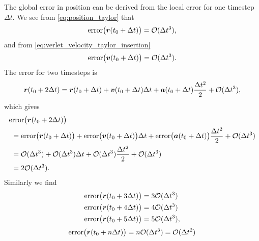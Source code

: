 The global error in position can be derived from the local error for one timestep $\Delta t$. We see from \cref{eq:position_taylor} that
\begin{align*}
    \text{error}\big(\boldsymbol{r}(t_0+\Delta t)\big) = \mathcal{O}(\Delta t^3),
\end{align*}
and from \cref{eq:verlet_velocity_taylor_insertion}
\begin{align*}
    \text{error}\big(\boldsymbol{v}(t_0+\Delta t)\big) = \mathcal{O}(\Delta t^3).
\end{align*}
The error for two timesteps is
\begin{align*}
    \boldsymbol{r}(t_0+2\Delta t) 
    &= \boldsymbol{r}(t_0+\Delta t) + \boldsymbol{v}(t_0+\Delta t)\Delta t + \boldsymbol{a}(t_0+\Delta t)\frac{\Delta t^2}{2} + \mathcal{O}(\Delta t^3), \\
\end{align*}
which gives 
\begin{align*}
    &\text{error}\big(\boldsymbol{r}(t_0+2\Delta t)\big) \\
    &~= \text{error}\big(\boldsymbol{r}(t_0+\Delta t)\big) + \text{error}\big(\boldsymbol{v}(t_0+\Delta t)\big)\Delta t + \text{error}\big(\boldsymbol{a}(t_0+\Delta t)\big)\frac{\Delta t^2}{2} + \mathcal{O}(\Delta t^3)\\
    &~= \mathcal{O}(\Delta t^3) + \mathcal{O}(\Delta t^3)\Delta t + \mathcal{O}(\Delta t^3)\frac{\Delta t^2}{2} + \mathcal{O}(\Delta t^3)\\
    &~= 2\mathcal{O}(\Delta t^3).
\end{align*}
Similarly we find
\begin{align*}
    &\text{error}\big(\boldsymbol{r}(t_0+3\Delta t)\big) = 3\mathcal{O}(\Delta t^3) \\
    &\text{error}\big(\boldsymbol{r}(t_0+4\Delta t)\big) = 4\mathcal{O}(\Delta t^3) \\
    &\text{error}\big(\boldsymbol{r}(t_0+5\Delta t)\big) = 5\mathcal{O}(\Delta t^3),
\end{align*}
\begin{align*}
    \text{error}\big(\boldsymbol{r}(t_0 + n\Delta t)\big) = n\mathcal{O}(\Delta t^3) = \mathcal{O}(\Delta t^2)
\end{align*}
